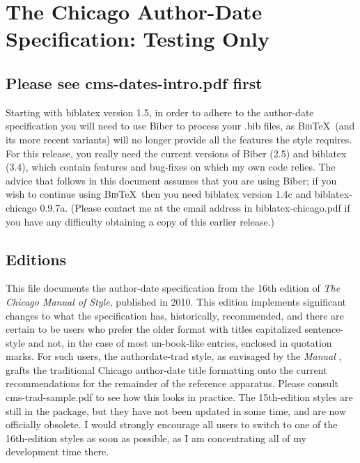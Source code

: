 \documentclass[a4paper,12pt]{report}
\begin{document}
\section*{The Chicago Author-Date Specification: Testing Only}
\label{sec:spec}

\subsection*{Please see cms-dates-intro.pdf first}
\label{bibernote}

Starting with \textsf{biblatex} version 1.5, in order to adhere to the
author-date specification you will need to use \textsf{Biber} to
process your .bib files, as \textsc{Bib}\TeX\ (and its more recent
variants) will no longer provide all the features the style requires.
For this release, you really need the current versions of
\textsf{Biber} (2.5) and \textsf{biblatex} (3.4), which contain
features and bug-fixes on which my own code relies.  The advice that
follows in this document assumes that you are using \textsf{Biber}; if
you wish to continue using \textsc{Bib}\TeX\ then you need
\textsf{biblatex} version 1.4c and \textsf{biblatex-chicago} 0.9.7a.
(Please contact me at the email address in
\textsf{biblatex-chicago.pdf} if you have any difficulty obtaining a
copy of this earlier release.)

\subsection*{Editions}
\label{editions}

This file documents the author-date specification from the 16th
edition of \emph{The Chicago Manual of Style}, published in 2010.
This edition implements significant changes to what the specification
has, historically, recommended, and there are certain to be users who
prefer the older format with titles capitalized sentence-style and
not, in the case of most un-book-like entries, enclosed in quotation
marks.  For such users, the \textsf{authordate-trad} style, as
envisaged by the \emph{Manual} \autocite*[15.45]{chicago:manual},
grafts the traditional Chicago author-date title formatting onto the
current recommendations for the remainder of the reference apparatus.
Please consult \textsf{cms-trad-sample.pdf} to see how this looks in
practice.  The 15th-edition styles are still in the package, but they
have not been updated in some time, and are now officially obsolete.
I would strongly encourage all users to switch to one of the
16th-edition styles as soon as possible, as I am concentrating all of
my development time there.
\end{document}
